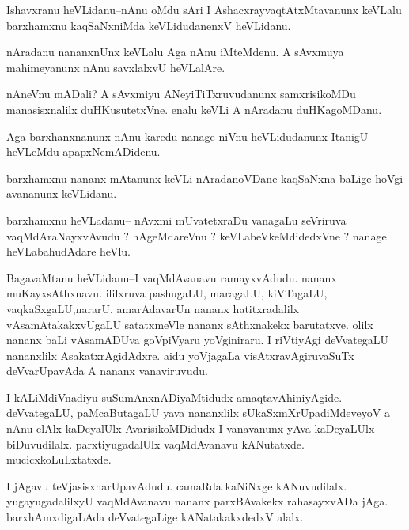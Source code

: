 \documentclass{article}
\begin{document}
\begin{mn}%
Ishavxranu heVLidanu--nAnu oMdu sAri I AshacxrayvaqtAtxMtavanunx keVLalu barxhamxnu 
kaqSaNxniMda keVLidudanenxV heVLidanu.
\end{mn}

\begin{mn}%
nAradanu nananxnUnx keVLalu Aga nAnu iMteMdenu. A sAvxmuya mahimeyanunx nAnu savxlalxvU 
heVLalAre.
\end{mn}

\begin{mn}%
nAneVnu mADali? A sAvxmiyu ANeyiTiTxruvudanunx samxrisikoMDu manasisxnalilx 
duHKusutetxVne. enalu keVLi A nAradanu duHKagoMDanu.
\end{mn}

\begin{mn}%
Aga barxhanxnanunx nAnu karedu nanage niVnu heVLidudanunx ItanigU heVLeMdu apapxNemADidenu.
\end{mn}

\begin{mn}%
barxhamxnu nananx mAtanunx keVLi nAradanoVDane kaqSaNxna baLige hoVgi avananunx keVLidanu.
\end{mn}

\begin{mn}%
barxhamxnu heVLadanu-- nAvxmi mUvatetxraDu vanagaLu seVriruva vaqMdAraNayxvAvudu ? 
hAgeMdareVnu ? keVLabeVkeMdidedxVne ? nanage heVLabahudAdare heVlu.
\end{mn}

\begin{mn}%
BagavaMtanu heVLidanu--I vaqMdAvanavu ramayxvAdudu. nananx muKayxsAthxnavu. ililxruva 
pashugaLU, maragaLU, kiVTagaLU, vaqkaSxgaLU,nararU. amarAdavarUn nananx hatitxradalilx 
vAsamAtakakxvUgaLU satatxmeVle nananx sAthxnakekx barutatxve. olilx nananx baLi vAsamADUva 
goVpiVyaru yoVginiraru. I riVtiyAgi deVvategaLU nananxlilx AsakatxrAgidAdxre. aidu 
yoVjagaLa visAtxravAgiruvaSuTx deVvarUpavAda A nananx vanaviruvudu.
\end{mn}

\begin{mn}%
I kALiMdiVnadiyu suSumAnxnADiyaMtidudx amaqtavAhiniyAgide. deVvategaLU, paMcaButagaLU yava 
nananxlilx sUkaSxmXrUpadiMdeveyoV a nAnu elAlx kaDeyalUlx AvarisikoMDidudx I vanavanunx 
yAva kaDeyaLUlx biDuvudilalx. parxtiyugadalUlx vaqMdAvanavu kANutatxde. mucicxkoLuLxtatxde.
\end{mn}

\begin{mn}%
I jAgavu teVjasisxnarUpavAdudu. camaRda kaNiNxge kANuvudilalx. yugayugadalilxyU 
vaqMdAvanavu nananx parxBAvakekx rahasayxvADa jAga. barxhAmxdigaLAda deVvategaLige 
kANatakakxdedxV alalx.
\end{mn}
\end{document}
